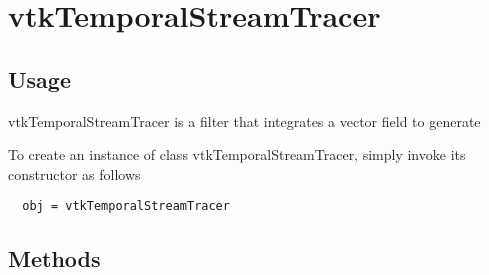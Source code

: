 \section{vtkTemporalStreamTracer}

\subsection{Usage}

 vtkTemporalStreamTracer is a filter that integrates a vector field to generate
 


To create an instance of class vtkTemporalStreamTracer, simply
invoke its constructor as follows
\begin{verbatim}
  obj = vtkTemporalStreamTracer
\end{verbatim}
\subsection{Methods}

